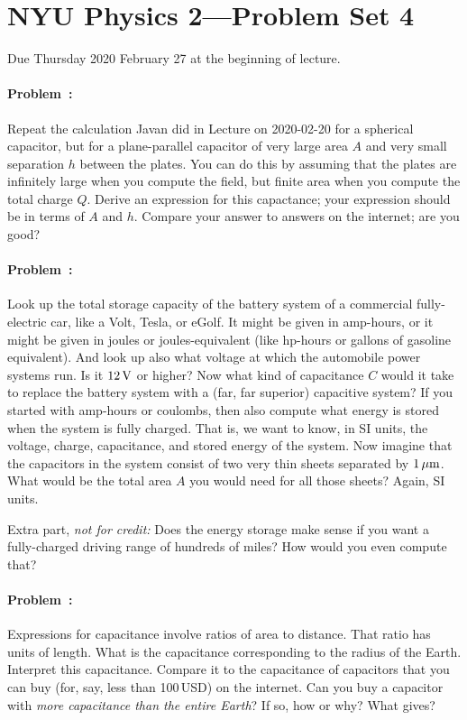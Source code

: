 \documentclass[12pt]{article}
\begin{document}
\section*{NYU Physics 2---Problem Set 4}

Due Thursday 2020 February 27 at the beginning of lecture.

\paragraph{Problem~\theproblem:}%
Repeat the calculation Javan did in Lecture on 2020-02-20 for a
spherical capacitor, but for a plane-parallel capacitor of very large
area $A$ and very small separation $h$ between the plates. You can do
this by assuming that the plates are infinitely large when you compute
the field, but finite area when you compute the total charge
$Q$. Derive an expression for this capactance; your
expression should be in terms of $A$ and $h$. Compare your answer to
answers on the internet; are you good?

\paragraph{Problem~\theproblem:}%
Look up the total storage capacity of the battery system of a
commercial fully-electric car, like a Volt, Tesla, or eGolf. It might
be given in amp-hours, or it might be given in joules or
joules-equivalent (like hp-hours or gallons of gasoline
equivalent). And look up also what voltage at which the automobile
power systems run. Is it $12\,\mathrm{V}$ or higher? Now what kind of
capacitance $C$ would it take to replace the battery system with a
(far, far superior) capacitive system? If you started with amp-hours
or coulombs, then also compute what energy is stored when the system
is fully charged. That is, we want to know, in SI units, the voltage,
charge, capacitance, and stored energy of the system. Now imagine that
the capacitors in the system consist of two very thin sheets separated
by $1\,\mathrm{\mu m}$.  What would be the total area $A$ you would need for all
those sheets? Again, SI units.

Extra part, \emph{not for credit:} Does the energy storage make sense
if you want a fully-charged driving range of hundreds of miles? How
would you even compute that?

\paragraph{Problem~\theproblem:}%
Expressions for capacitance involve ratios of area to distance.  That
ratio has units of length. What is the capacitance corresponding to
the radius of the Earth. Interpret this capacitance. Compare it to the
capacitance of capacitors that you can buy (for, say, less than
100\,USD) on the internet. Can you buy a capacitor with \emph{more
  capacitance than the entire Earth}? If so, how or why? What gives?
\end{document}
